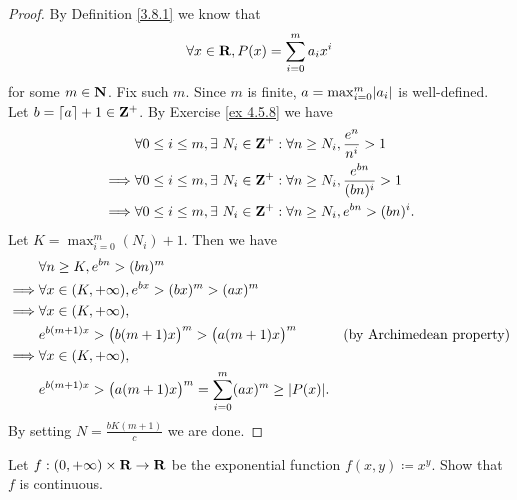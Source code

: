 \begin{proof}
    By Definition \ref{3.8.1} we know that
    \[
        \forall x \in \mathbf{R}, P(x) = \sum_{i = 0}^m a_i x^i
    \]
    for some \(m \in \mathbf{N}\).
    Fix such \(m\).
    Since \(m\) is finite, \(a = \max_{i = 0}^m \abs{a_i}\) is well-defined.
    Let \(b = \left\lceil a\right\rceil + 1 \in \mathbf{Z}^+\).
    By Exercise \ref{ex 4.5.8} we have
    \begin{align*}
                 & \forall 0 \leq i \leq m, \exists\ N_i \in \mathbf{Z}^+ : \forall n \geq N_i, \frac{e^n}{n^i} > 1       \\
        \implies & \forall 0 \leq i \leq m, \exists\ N_i \in \mathbf{Z}^+ : \forall n \geq N_i, \frac{e^{bn}}{(bn)^i} > 1 \\
        \implies & \forall 0 \leq i \leq m, \exists\ N_i \in \mathbf{Z}^+ : \forall n \geq N_i, e^{bn} > (bn)^i.
    \end{align*}
    Let \(K = \max_{i = 0}^m(N_i) + 1\).
    Then we have
    \begin{align*}
                 & \forall n \geq K, e^{bn} > (bn)^m                                                                                     \\
        \implies & \forall x \in (K, +\infty), e^{bx} > (bx)^m > (ax)^m                                                                  \\
        \implies & \forall x \in (K, +\infty),                                                                                           \\
                 & e^{b (m + 1) x} > \big(b (m + 1) x\big)^m > \big(a (m + 1) x\big)^m                & \text{(by Archimedean property)} \\
        \implies & \forall x \in (K, +\infty),                                                                                           \\
                 & e^{b (m + 1) x} > \big(a (m + 1) x\big)^m = \sum_{i = 0}^m (ax)^m \geq \abs{P(x)}.
    \end{align*}
    By setting \(N = \frac{b K (m + 1)}{c}\) we are done.
\end{proof}

\begin{exercise}\label{ex 4.5.10}
    Let \(f : (0, +\infty) \times \mathbf{R} \to \mathbf{R}\) be the exponential function \(f(x, y) \coloneqq x^y\).
    Show that \(f\) is continuous.
\end{exercise}

